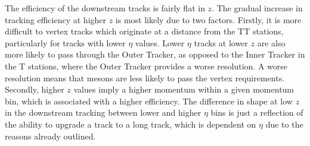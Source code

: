 The efficiency of the downstream tracks is fairly flat in $z$. The gradual increase in tracking efficiency at higher $z$ is most likely due to two factors. Firstly, it is more difficult to vertex tracks which originate at a distance from the TT stations, particularly for tracks with lower $\eta$ values. Lower $\eta$ tracks at lower $z$ are also more likely to pass through the Outer Tracker, as opposed to the Inner Tracker in the T stations, where the Outer Tracker provides a worse resolution. A worse resolution means that \KS mesons are less likely to pass the vertex requirements. Secondly, higher $z$ values imply a higher momentum within a given momentum bin, which is associated with a higher efficiency. The difference in shape at low $z$ in the downstream tracking between lower and higher $\eta$ bins is just a reflection of the ability to upgrade a track to a long track, which is dependent on $\eta$ due to the reasons already outlined.






  

 

